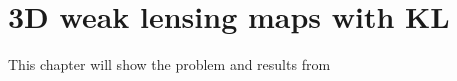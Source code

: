 \chapter{3D weak lensing maps with KL}

This chapter will show the problem and results from \citep{Vanderplas2011}
